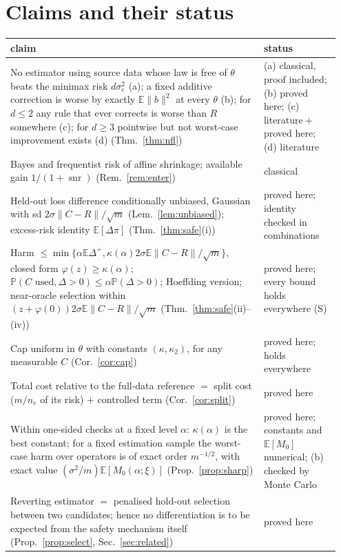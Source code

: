 \documentclass[10pt,a4paper]{article}
\theoremstyle{plain}
\theoremstyle{definition}
\theoremstyle{remark}
\newcommand{\E}{\mathbb{E}}
\newcommand{\Prob}{\mathbb{P}}
\newcommand{\norm}[1]{\lVert #1\rVert}
\DeclareMathOperator{\snr}{snr}
\begin{document}
\section{Claims and their status}\label{sec:claims}

\begin{table}[htbp]
\centering\footnotesize
\begin{tabular}{L{0.73\linewidth}L{0.22\linewidth}}
\toprule
claim & status\\
\midrule
No estimator using source data whose law is free of $\theta$ beats the minimax risk $d\sigma_e^2$ (a); a fixed additive correction is worse by exactly $\E\norm b^2$ at every $\theta$ (b); for $d\le2$ any rule that ever corrects is worse than $R$ somewhere (c); for $d\ge3$ pointwise but not worst-case improvement exists (d) (Thm.~\ref{thm:nfl}) & (a) classical, proof included; (b) proved here; (c) literature${}+{}$proved here; (d) literature\\
Bayes and frequentist risk of affine shrinkage; available gain $1/(1+\snr)$ (Rem.~\ref{rem:enter}) & classical\\
Held-out loss difference conditionally unbiased, Gaussian with sd $2\sigma\norm{C-R}/\sqrt m$ (Lem.~\ref{lem:unbiased}); excess-risk identity $\E[\Delta\pi]$ (Thm.~\ref{thm:safe}(i)) & proved here; identity checked in \CnConfigs{} combinations\\
Harm $\le\min\{\alpha\E\Delta^+,\kappa(\alpha)2\sigma\E\norm{C-R}/\sqrt m\}$, closed form $\varphi(z)\ge\kappa(\alpha)$; $\Prob(C\text{ used},\Delta>0)\le\alpha\Prob(\Delta>0)$; Hoeffding version; near-oracle selection within $(z+\varphi(0))2\sigma\E\norm{C-R}/\sqrt m$ (Thm.~\ref{thm:safe}(ii)--(iv)) & proved here; every bound holds everywhere (S)\\
Cap uniform in $\theta$ with constants $(\kappa,\kappa_2)$, for any measurable $C$ (Cor.~\ref{cor:cap}) & proved here; holds everywhere\\
Total cost relative to the full-data reference $=$ split cost ($m/n_e$ of its risk) $+$ controlled term (Cor.~\ref{cor:split}) & proved here\\
Within one-sided checks at a fixed level $\alpha$: $\kappa(\alpha)$ is the best constant; for a fixed estimation sample the worst-case harm over operators is of exact order $m^{-1/2}$, with exact value $(\sigma^2/m)\E[M_0(\alpha;\xi)]$ (Prop.~\ref{prop:sharp}) & proved here; constants and $\E[M_0]$ numerical; (b) checked by Monte Carlo\\
Reverting estimator $=$ penalised hold-out selection between two candidates; hence no differentiation is to be expected from the safety mechanism itself (Prop.~\ref{prop:select}, Sec.~\ref{sec:related}) & proved here\\

\end{tabular}
\end{table}
\end{document}
